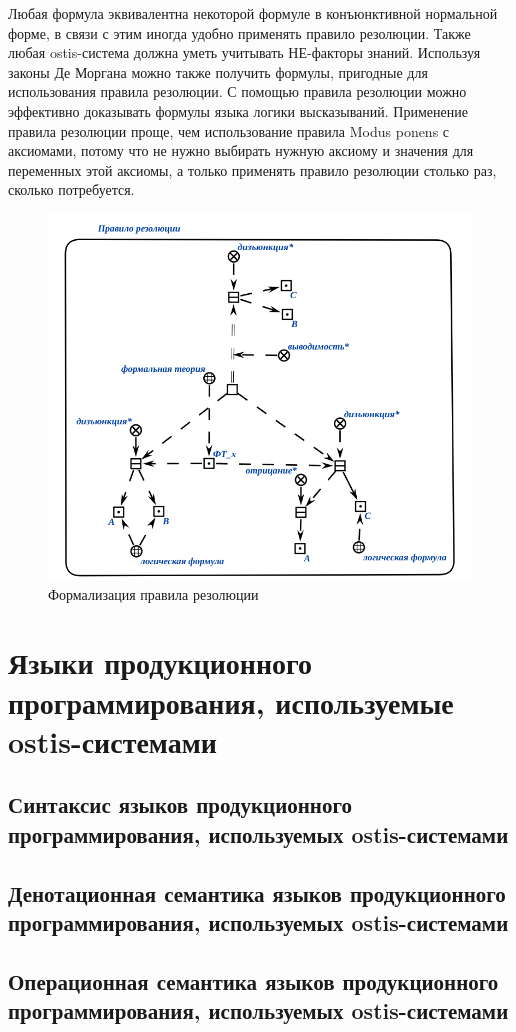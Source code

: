 Любая формула эквивалентна некоторой формуле в конъюнктивной нормальной форме, в связи с этим иногда удобно применять правило резолюции. Также любая ostis-система должна уметь учитывать НЕ-факторы знаний. Используя законы Де Моргана можно также получить формулы, пригодные для использования правила резолюции.
С помощью правила резолюции можно эффективно доказывать формулы языка логики высказываний.
Применение правила резолюции проще, чем использование правила Modus ponens с аксиомами, потому что не нужно выбирать нужную аксиому и значения для переменных этой аксиомы, а только применять правило резолюции столько раз, сколько потребуется.

\begin{figure}[H]
	\includegraphics[scale=0.8]{author/part3/figures/resolution.png}
	\caption{Формализация правила резолюции}
	\label{fig:modus_ponens}
\end{figure}

\section{Языки продукционного программирования, используемые ostis-системами}
\subsection{Синтаксис языков продукционного программирования, используемых ostis-системами}
\subsection{Денотационная семантика языков продукционного программирования, используемых ostis-системами}
\subsection{Операционная семантика языков продукционного программирования, используемых ostis-системами}

%
